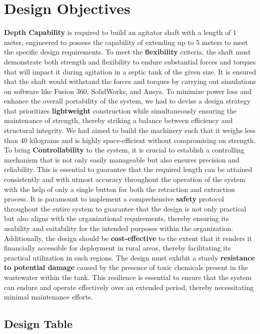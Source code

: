 \documentclass[a4,10pt]{report}
\begin{document}
\section{Design Objectives}
\textbf{Depth Capability} is required to build an agitator shaft with a length of 1 meter, engineered to possess the capability of extending up to 5 meters to meet the specific design requirements. To meet the \textbf{flexibility} criteria, the shaft must demonstrate both strength and flexibility to endure substantial forces and torques that will impact it during agitation in a septic tank of the given size. It is ensured that the shaft would withstand the forces and torques by carrying out simulations on software like Fusion 360, SolidWorks, and Ansys. To minimize power loss and enhance the overall portability of the system, we had to devise a design strategy that prioritizes \textbf{lightweight} construction while simultaneously ensuring the maintenance of strength, thereby striking a balance between efficiency and structural integrity. We had aimed to build the machinery such that it weighs less than 40 kilograms and is highly space-efficient without compromising on strength. 
\vspace{2mm} \\
To bring \textbf{Controllability} to the system, it is crucial to establish a controlling mechanism that is not only easily manageable but also ensures precision and reliability. This is essential to guarantee that the required length can be attained consistently and with utmost accuracy throughout the operation of the system with the help of only a single button for both the retraction and extraction process. It is paramount to implement a comprehensive \textbf{safety} protocol throughout the entire system to guarantee that the design is not only practical but also aligns with the organizational requirements, thereby ensuring its usability and suitability for the intended purposes within the organization. Additionally, the design should be \textbf{cost-effective} to the extent that it renders it financially accessible for deployment in rural areas, thereby facilitating its practical utilization in such regions. The design must exhibit a sturdy \textbf{resistance to potential damage} caused by the presence of toxic chemicals present in the wastewater within the tank. This resilience is essential to ensure that the system can endure and operate effectively over an extended period, thereby necessitating minimal maintenance efforts.

\subsection*{Design Table}
\end{document}
